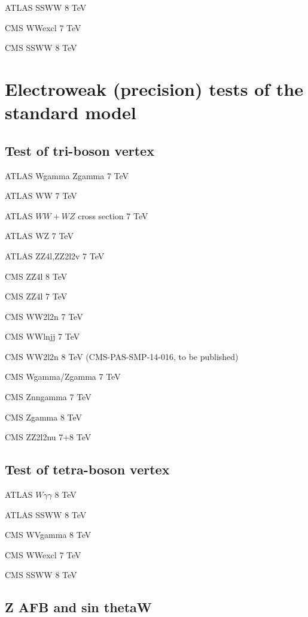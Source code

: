 \documentclass[12pt]{iopart}
\begin{document}
ATLAS SSWW 8 TeV~\cite{Aad:2014zda}

CMS WWexcl 7 TeV~\cite{Chatrchyan:2013foa}

CMS SSWW 8 TeV~\cite{Khachatryan:2014sta}

\section{Electroweak (precision) tests of the standard model}
\subsection{Test of tri-boson vertex}

ATLAS Wgamma Zgamma 7 TeV~\cite{Aad:2013izg}

ATLAS WW 7 TeV~\cite{ATLAS:2012mec}

ATLAS $WW+WZ$ cross section 7 TeV~\cite{Aad:2014mda}

ATLAS WZ 7 TeV~\cite{Aad:2012twa}

ATLAS ZZ4l,ZZ2l2v 7 TeV~\cite{Aad:2012awa}

CMS ZZ4l 8 TeV~\cite{Khachatryan:2014dia}

CMS ZZ4l 7 TeV~\cite{Chatrchyan:2012sga}

CMS WW2l2n 7 TeV~\cite{Chatrchyan:2013yaa}

CMS WWlnjj 7 TeV~\cite{Chatrchyan:2012bd}

CMS WW2l2n 8 TeV (CMS-PAS-SMP-14-016, to be published)

CMS Wgamma/Zgamma 7 TeV~\cite{Chatrchyan:2013fya}

CMS Znngamma 7 TeV~\cite{Chatrchyan:2013nda}

CMS Zgamma 8 TeV~\cite{Khachatryan:2015kea}

CMS ZZ2l2nu 7+8 TeV~\cite{Khachatryan:2015pba}

\subsection{Test of tetra-boson vertex}

ATLAS $W\gamma\gamma$ 8 TeV~\cite{Aad:2015uqa}

ATLAS SSWW 8 TeV~\cite{Aad:2014zda}

CMS WVgamma 8 TeV~\cite{Chatrchyan:2014bza}

CMS WWexcl 7 TeV~\cite{Chatrchyan:2013foa}

CMS SSWW 8 TeV~\cite{Khachatryan:2014sta}

\subsection{Z AFB and sin thetaW}
\end{document}
